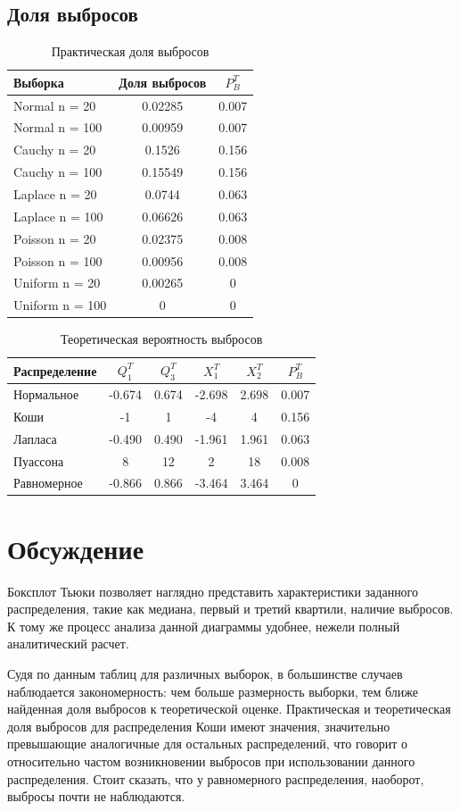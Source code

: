\documentclass[12pt,a4paper]{article}
\begin{document}
\subsection{Доля выбросов}
\begin{table}[H]
	\centering
	\begin{tabular}{|l|c|c|}
		\hline
		Выборка & Доля выбросов	& $P^T_B$\\\hline
		\hline
		Normal n = 20 & 0.02285 & 0.007\\\hline
		Normal n = 100 & 0.00959 & 0.007\\\hline
		Cauchy n = 20 & 0.1526 & 0.156\\\hline
		Cauchy n = 100 & 0.15549 & 0.156\\\hline
		Laplace n = 20 & 0.0744 & 0.063\\\hline
		Laplace n = 100 & 0.06626 & 0.063\\\hline
		Poisson n = 20 & 0.02375 & 0.008\\\hline
		Poisson n = 100 & 0.00956 & 0.008\\\hline
		Uniform n = 20 & 0.00265 & 0\\\hline
		Uniform n = 100 & 0 & 0\\\hline
	\end{tabular}
	\caption{Практическая доля выбросов}
\end{table}

\begin{table}[H]
	\centering
	\begin{tabular}{|l|c|c|c|c|c|}
		\hline
		Распределение & $Q_1^T$	& $Q_3^T$ & $X_1^T$ & $X_2^T$ & $P_B^T$\\\hline
		\hline
		Нормальное & -0.674 & 0.674 & -2.698 &  2.698 & 0.007\\\hline
		Коши & -1 & 1 & -4 & 4 & 0.156\\\hline
		Лапласа & -0.490 & 0.490 & -1.961 & 1.961 & 0.063\\\hline
		Пуассона & 8 & 12 & 2 & 18 & 0.008\\\hline
		Равномерное & -0.866 & 0.866 & -3.464 & 3.464 & 0\\\hline
	\end{tabular}
	\caption{Теоретическая вероятность выбросов}
\end{table}

\section{Обсуждение}
Боксплот Тьюки позволяет наглядно представить характеристики заданного распределения, такие как медиана, первый и третий квартили, наличие выбросов. К тому же процесс анализа данной диаграммы удобнее, нежели полный аналитический расчет.

Судя по данным таблиц для различных выборок, в большинстве случаев наблюдается закономерность: чем больше размерность выборки, тем ближе найденная доля выбросов к теоретической оценке. Практическая и теоретическая доля выбросов для распределения Коши имеют значения, значительно превышающие аналогичные для остальных распределений, что говорит о относительно частом возникновении выбросов при использовании данного распределения. Стоит сказать, что у равномерного распределения, наоборот, выбросы почти не наблюдаются.
\end{document}
